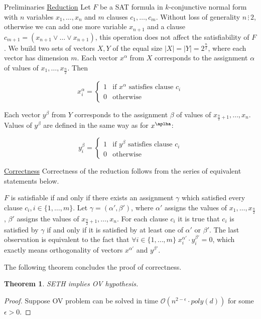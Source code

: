 \documentclass[12pt]{article}
\newtheorem{theorem}{Theorem}[section]
\begin{document}
\begin{section}{Preliminaries}
\underline{Reduction} Let $F$ be a SAT formula in $k$-conjunctive normal form with $n$ variables $x_1, \ldots, x_n$ and $m$ clauses $c_1, \ldots, c_m$. Without loss of generality $n \, \vdots \, 2$, otherwise we can add one more variable $x_{n+1}$ and a clause $c_{m+1} = (x_{n+1} \vee \ldots \vee x_{n+1})$, this operation does not affect the satisfiability of $F$. We build two sets of vectors $X, Y$ of the equal size $|X|=|Y|=2^{\frac{n}{2}}$, where each vector has dimension $m$. Each vector $x^{\alpha}$ from $X$ corresponds to the assignment $\alpha$ of values of $x_1, \ldots, x_{\frac{n}{2}}$. Then 

$$x^{\alpha}_i = 
\begin{cases}
1 &\text{if $x^{\alpha}$ satisfies clause $c_i$}\\
0 &\text{otherwise}
\end{cases}$$

Each vector $y^{\beta}$ from $Y$ corresponds to the assignment $\beta$ of values of $x_{\frac{n}{2} + 1}, \ldots, x_n$. Values of $y^{\beta}$ are defined in the same way as for $x^{\aplha}$:

$$y^{\beta}_i = 
\begin{cases}
1 &\text{if $y^{\beta}$ satisfies clause $c_i$}\\
0 &\text{otherwise}
\end{cases}$$

\underline{Correctness} Correctness of the reduction follows from the series of equivalent statements below. 

$F$ is satisfiable if and only if there exists an assignment $\gamma$ which satisfied every clause $c_i, i \in \{1, \ldots, m\}$. Let $\gamma = (\alpha', \beta')$, where $\alpha'$ assigns the values of $x_1, \ldots, x_{\frac{n}{2}}$, $\beta'$ assigns the values of $x_{\frac{n}{2} + 1}, \ldots, x_n$. For each clause $c_i$ it is true that $c_i$ is satisfied by $\gamma$ if and only if it is satisfied by at least one of $\alpha'$ or $\beta'$. The last observation is equivalent to the fact that $\forall i \in \{1, \ldots, m\} \; x^{\alpha'}_i \cdot y^{\beta'}_i = 0$, which exactly means orthogonality of vectors $x^{\alpha'}$ and $y^{\beta'}$.

The following theorem concludes the proof of correctness.

\begin{theorem}
SETH implies OV hypothesis.
\end{theorem}

\begin{proof}
Suppose OV problem can be solved in time $\mathcal{O}(n^{2 - \epsilon} \cdot poly(d))$ for some $\epsilon > 0$. 


\end{proof}
\end{section}
\end{document}
